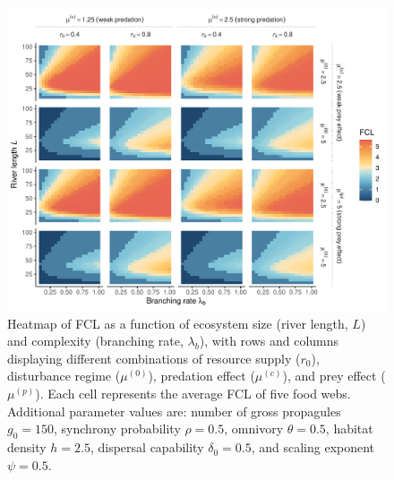 \begin{figure}
\centering
\includegraphics{../data_fmt/fig_rho05_g150_theta05.pdf}
\caption{Heatmap of FCL as a function of ecosystem size (river length,
\(L\)) and complexity (branching rate, \(\lambda_b\)), with rows and
columns displaying different combinations of resource supply (\(r_0\)),
disturbance regime (\(\mu^{(0)}\)), predation effect (\(\mu^{(c)}\)),
and prey effect (\(\mu^{(p)}\)). Each cell represents the average FCL of
five food webs. Additional parameter values are: number of gross
propagules \(g_0=150\), synchrony probability \(\rho=0.5\), omnivory
\(\theta=0.5\), habitat density \(h=2.5\), dispersal capability
\(\delta_0=0.5\), and scaling exponent \(\psi=0.5\).}
\end{figure}

\newpage
